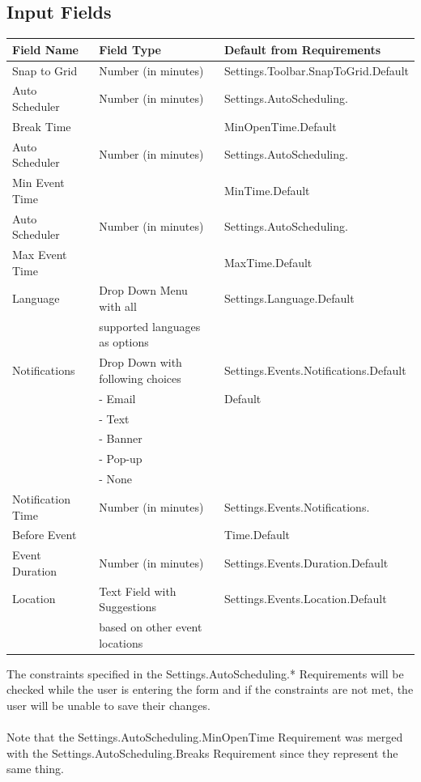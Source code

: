 \documentclass{scrreprt}
\begin{document}
\subsection{Input Fields}

\begin{center}
\begin{longtable}{ | p{3cm} | p{6cm} | p{6cm} | }
\hline
\textbf{Field Name} & \textbf{Field Type} & \textbf{Default from Requirements} \\
\hline
Snap to Grid & Number (in minutes) & Settings.Toolbar.SnapToGrid.Default \\
\hline
Auto Scheduler & Number (in minutes) & Settings.AutoScheduling. \\
Break Time & & MinOpenTime.Default\\
\hline
Auto Scheduler & Number (in minutes) & Settings.AutoScheduling. \\
Min Event Time & & MinTime.Default\\
\hline
Auto Scheduler & Number (in minutes) & Settings.AutoScheduling. \\
Max Event Time & & MaxTime.Default\\
\hline
Language & Drop Down Menu with all & Settings.Language.Default \\
& supported languages as options & \\
\hline
Notifications & Drop Down with following choices & Settings.Events.Notifications.Default \\
& - Email & Default\\
& - Text & \\
& - Banner & \\
& - Pop-up & \\
& - None & \\
\hline
Notification Time & Number (in minutes) & Settings.Events.Notifications. \\
Before Event & & Time.Default \\
\hline
Event Duration & Number (in minutes) & Settings.Events.Duration.Default \\
\hline
Location & Text Field with Suggestions & Settings.Events.Location.Default \\
& based on other event locations & \\
\hline
\end{longtable}
\end{center}
The constraints specified in the Settings.AutoScheduling.* Requirements will be checked while the user is entering the form and if the constraints are not met, the user will be unable to save their changes.
\\\\
Note that the Settings.AutoScheduling.MinOpenTime Requirement was merged with the Settings.AutoScheduling.Breaks Requirement since they represent the same thing.
\end{document}
